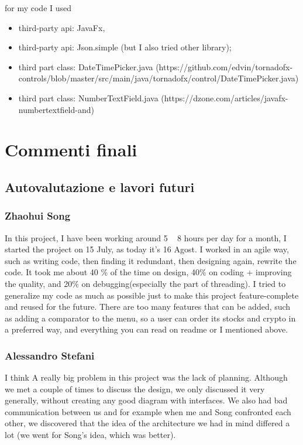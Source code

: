 \documentclass[a4paper,12pt]{report}
\begin{document}
for my code I used
\begin{itemize}
    \item third-party api: JavaFx,
    \item third-party api: Json.simple (but I also tried other library);
    \item third part class: DateTimePicker.java (https://github.com/edvin/tornadofx-controls/blob/master/src/main/java/tornadofx/control/DateTimePicker.java)
    \item third part class: NumberTextField.java (https://dzone.com/articles/javafx-numbertextfield-and)
\end{itemize}


\chapter{Commenti finali}

\section{Autovalutazione e lavori futuri}

\subsection*{Zhaohui Song}
In this project, I have been working around 5 ~ 8 hours per day for a month, I started the project on 15 July,  as today it's 16 Agost.
%
I worked in an agile way, such as writing code, then finding it redundant, then designing again, rewrite the code. 
%
It took me about 40 \% of the time on design, 40\% on coding + improving the quality, and 20\% on debugging(especially the part of threading). 
%
I tried to generalize my code as much as possible just to make this project feature-complete and reused for the future. 
%
There are too many features that can be added, such as adding a comparator to the menu, so a user can order its stocks and crypto in a preferred way, and everything you can read on readme or I mentioned above.  

\subsection*{Alessandro Stefani}
I think A really big problem in this project was the lack of planning. Although we met a couple of times to discuss the design, we only discussed it very generally, without creating any good diagram with interfaces. We also had bad communication between us and for example when me and Song confronted each other, we discovered that the idea of the architecture we had in mind differed a lot (we went for Song's idea, which was better).
\end{document}
